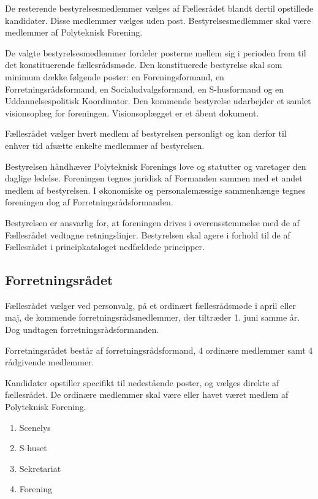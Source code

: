 \begin{list}
 De resterende bestyrelsesmedlemmer vælges af Fællesrådet blandt dertil opstillede kandidater. Disse medlemmer vælges uden post. Bestyrelsesmedlemmer skal være medlemmer af Polyteknisk Forening.

 De valgte bestyrelsesmedlemmer fordeler posterne mellem sig i perioden frem til det konstituerende fællesrådsmøde. Den konstituerede bestyrelse skal som minimum dække følgende poster: en Foreningsformand, en Forretningsrådsformand, en Socialudvalgsformand, en S-husformand og en Uddannelsespolitisk Koordinator. Den kommende bestyrelse udarbejder et samlet visionsoplæg for foreningen. Visionsoplægget er et åbent dokument.

 Fællesrådet vælger hvert medlem af bestyrelsen personligt og kan derfor til enhver tid afsætte enkelte medlemmer af bestyrelsen.

\item Bestyrelsen håndhæver Polyteknisk Forenings love og statutter og varetager den daglige ledelse. Foreningen tegnes juridisk af Formanden sammen med et andet medlem af bestyrelsen. I økonomiske og personalemæssige sammenhænge tegnes foreningen dog af Forretningsrådsformanden.

\item Bestyrelsen er ansvarlig for, at foreningen drives i overensstemmelse med de af Fællesrådet vedtagne retningslinjer. Bestyrelsen skal agere i forhold til de af Fællesrådet i principkataloget nedfældede principper.



\subsection{Forretningsrådet}
\label{L:kap:FRR}
\item Fællesrådet vælger ved personvalg, på et ordinært fællesrådsmøde i april eller maj, de kommende forretningsrådsmedlemmer, der tiltræder 1. juni samme år. Dog undtagen forretningsrådsformanden.

 Forretningsrådet består af forretningsrådsformand, 4 ordinære medlemmer samt 4 rådgivende medlemmer.

 Kandidater opstiller specifikt til nedestående poster, og vælges direkte af fællesrådet. De ordinære medlemmer skal være eller havet været medlem af Polyteknisk Forening.

\begin{enumerate}
\item Scenelys
\item S-huset
\item Sekretariat
\item Forening
\end{enumerate}


\end{list}
